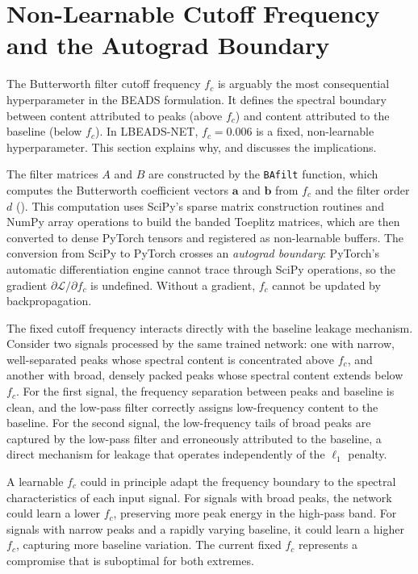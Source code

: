 \section{Non-Learnable Cutoff Frequency and the Autograd Boundary}
\label{sec:disc_fc}

The Butterworth filter cutoff frequency $f_c$ is arguably the most consequential hyperparameter in the BEADS formulation. It defines the spectral boundary between content attributed to peaks (above $f_c$) and content attributed to the baseline (below $f_c$). In LBEADS-NET, $f_c = 0.006$ is a fixed, non-learnable hyperparameter. This section explains why, and discusses the implications.

The filter matrices $A$ and $B$ are constructed by the \texttt{BAfilt} function, which computes the Butterworth coefficient vectors $\mathbf{a}$ and $\mathbf{b}$ from $f_c$ and the filter order $d$ (). This computation uses SciPy's sparse matrix construction routines and NumPy array operations to build the banded Toeplitz matrices, which are then converted to dense PyTorch tensors and registered as non-learnable buffers. The conversion from SciPy to PyTorch crosses an \emph{autograd boundary}: PyTorch's automatic differentiation engine cannot trace through SciPy operations, so the gradient $\partial \mathcal{L} / \partial f_c$ is undefined. Without a gradient, $f_c$ cannot be updated by backpropagation.

The fixed cutoff frequency interacts directly with the baseline leakage mechanism. Consider two signals processed by the same trained network: one with narrow, well-separated peaks whose spectral content is concentrated above $f_c$, and another with broad, densely packed peaks whose spectral content extends below $f_c$. For the first signal, the frequency separation between peaks and baseline is clean, and the low-pass filter correctly assigns low-frequency content to the baseline. For the second signal, the low-frequency tails of broad peaks are captured by the low-pass filter and erroneously attributed to the baseline, a direct mechanism for leakage that operates independently of the $\ell_1$ penalty.

A learnable $f_c$ could in principle adapt the frequency boundary to the spectral characteristics of each input signal. For signals with broad peaks, the network could learn a lower $f_c$, preserving more peak energy in the high-pass band. For signals with narrow peaks and a rapidly varying baseline, it could learn a higher $f_c$, capturing more baseline variation. The current fixed $f_c$ represents a compromise that is suboptimal for both extremes.

